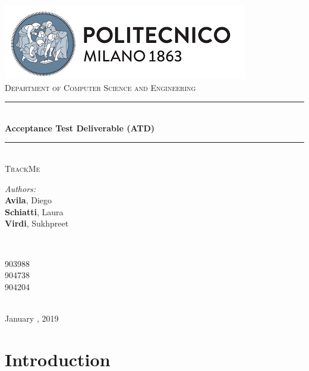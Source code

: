 \documentclass[a4paper, hidelinks, 12pt]{report}
\begin{document}
	\begin{titlepage}
		\centering
		\vspace*{0.7 cm}
		\includegraphics[scale = 0.85]{../Assets/PolimiLogo.png}\\[1.6 cm]
		\textsc{\large Department of Computer Science and Engineering}\\[1.8 cm]

		\rule{\linewidth}{0.2 mm} \\[0.4 cm]
		{ \huge \bfseries Acceptance Test Deliverable (ATD)}\\
		\rule{\linewidth}{0.2 mm} \\[1.5 cm]

		\textsc{\Large TrackMe}\\[3 cm]

		\begin{minipage}{0.4\textwidth}
			\begin{flushleft} \large
				\emph{Authors:}\\
				\textbf{Avila}, Diego \\
				\textbf{Schiatti}, Laura \\
				\textbf{Virdi}, Sukhpreet
			\end{flushleft}
		\end{minipage}~
		\begin{minipage}{0.4\textwidth}
			\begin{flushright} \large
				903988 \\
				904738 \\
				904204
			\end{flushright}
		\end{minipage}\\[2 cm]


		{\large January  , 2019}\\[2 cm]

		\vfill
	\end{titlepage}

	\tableofcontents
	\newpage
	\listoftables
	\clearpage
	\setcounter{page}{1}

	\chapter{Introduction}
\end{document}
